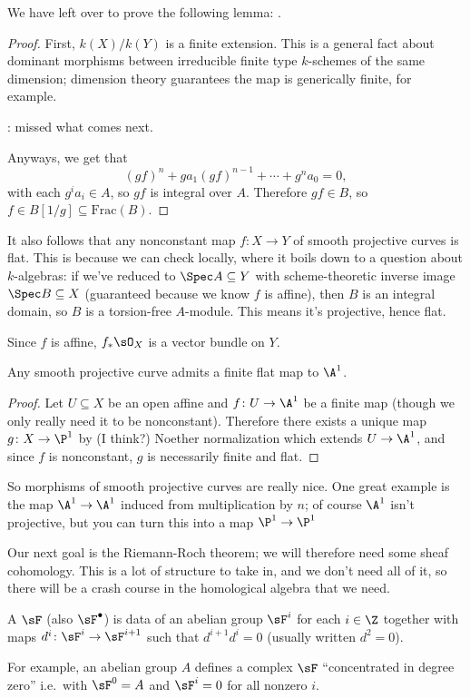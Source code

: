
We have left over to prove the following lemma: \TODO.
\begin{proof}
First, $k(X)/k(Y)$ is a finite extension. This is a general fact about dominant morphisms between irreducible finite type $k$-schemes of the same dimension; dimension theory guarantees the map is generically finite, for example.

\TODO: missed what comes next.

Anyways, we get that
\begin{equation}
	(gf)^n + ga_1(gf)^{n-1} + \dotsb + g^na_0 = 0,
\end{equation}
with each $g^ia_i\in A$, so $gf$ is integral over $A$. Therefore $gf\in B$, so $f\in B[1/g]\subseteq\mathrm{Frac}(B)$.
\end{proof}
\begin{rem}
It also follows that any nonconstant map $f\colon X\to Y$ of smooth projective curves is flat. This is because we can check locally, where it boils down to a question about $k$-algebras: if we've reduced to $\Spec A\subseteq Y$ with scheme-theoretic inverse image $\Spec B\subseteq X$ (guaranteed because we know $f$ is affine), then $B$ is an integral domain, so $B$ is a torsion-free $A$-module. This means it's projective, hence flat.
\end{rem}
Since $f$ is affine, $f_*\sO_X$ is a vector bundle on $Y$.
\begin{cor}
Any smooth projective curve admits a finite flat map to $\A^1$.
\end{cor}
\begin{proof}
Let $U\subseteq X$ be an open affine and $f\colon U\to\A^1$ be a finite map (though we only really need it to be nonconstant). Therefore there exists a unique map $g\colon X\to\P^1$ by (I think?) Noether normalization which extends $U\to\A^1$, and since $f$ is nonconstant, $g$ is necessarily finite and flat.
\end{proof}
So morphisms of smooth projective curves are really nice. One great example is the map $\A^1\to\A^1$ induced from multiplication by $n$; of course $\A^1$ isn't projective, but you can turn this into a map $\P^1\to\P^1$

\orbreak

Our next goal is the Riemann-Roch theorem; we will therefore need some sheaf cohomology. This is a lot of structure to take in, and we don't need all of it, so there will be a crash course in the homological algebra that we need.
\begin{defn}
A  $\sF$ (also $\sF^\bullet$) is data of an abelian group $\sF^i$ for each $i\in\Z$ together with maps $d^i\colon\sF^i\to\sF^{i+1}$ such that $d^{i+1}d^i = 0$ (usually written $d^2 = 0$).
\end{defn}
For example, an abelian group $A$ defines a complex $\sF$ ``concentrated in degree zero'' i.e.\ with $\sF^0 = A$ and $\sF^i = 0$ for all nonzero $i$.

